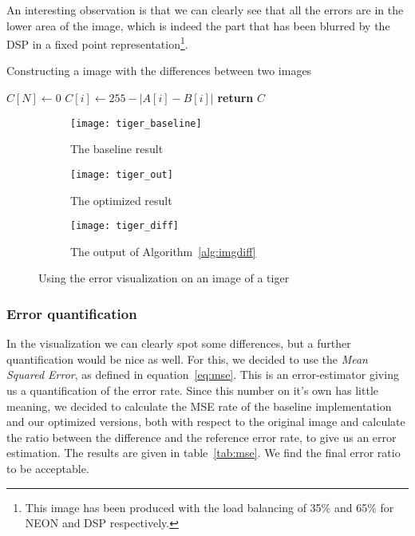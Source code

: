 An interesting observation is that we can clearly see that all the errors are in the lower area of the image, which is indeed the part that has been blurred by the DSP in a fixed point representation\footnote{This image has been produced with the load balancing of 35\% and 65\% for NEON and DSP respectively.}.

\begin{algorithm}[t]
    \caption{Constructing a image with the differences between two images}\label{alg:imgdiff}
    \begin{algorithmic}[1]
          
        \State $C[N]\gets 0$
           \State $C[i]\gets 255 - |A[i] - B[i]|$   
        \EndFor
        \State \textbf{return} $C$
        \EndProcedure
    \end{algorithmic}
\end{algorithm}

\begin{figure}
    \centering
    \begin{subfigure}[b]{0.3\textwidth}
            \texttt{[image: tiger\_baseline]}
            \caption{The baseline result}
            \label{fig:er_tiger_baseline}
    \end{subfigure}
    \begin{subfigure}[b]{0.3\textwidth}
            \texttt{[image: tiger\_out]}
            \caption{The optimized result}
            \label{fig:er_tiger_out}
    \end{subfigure}
    \begin{subfigure}[b]{0.3\textwidth}
            \texttt{[image: tiger\_diff]}
            \caption{The output of Algorithm~\ref{alg:imgdiff}}
            \label{fig:er_tiger_diff}
    \end{subfigure}
    \caption{Using the error visualization on an image of a tiger}
    \label{fig:imgdiff}
\end{figure}

\subsubsection{Error quantification}
In the visualization we can clearly spot some differences, but a further quantification would be nice as well. For this, we decided to use the \emph{Mean Squared Error}, as defined in equation~\ref{eq:mse}. This is an error-estimator giving us a quantification of the error rate. Since this number on it's own has little meaning, we decided to calculate the MSE rate of the baseline implementation and our optimized versions, both with respect to the original image and calculate the ratio between the difference and the reference error rate, to give us an error estimation. The results are given in table~\ref{tab:mse}. We find the final error ratio to be acceptable.

